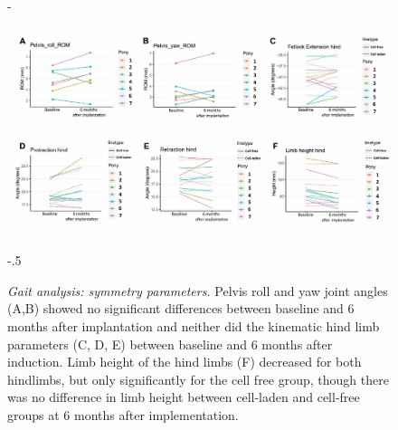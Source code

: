 \documentclass[twocolumn, empirical, authordate, issue]{jote-new-article}
\begin{document}
\begin{figure}
\captionsetup{width=\dimexpr \linewidth + \fullwidthlen\relax}

\begin{adjustwidth}{-\fullwidthlen}{}

 \includegraphics[width=\columnwidth+.8\fullwidthlen]{media/image12.jpg}
  \end{adjustwidth}
\begin{adjustwidth}{-.5\fullwidthlen}{}
\caption{\emph{Gait analysis: symmetry parameters.}
 Pelvis roll and yaw joint angles (A,B) showed no significant differences between baseline and 6 months after implantation and neither did the kinematic hind limb parameters (C, D, E) between baseline and 6 months after induction. Limb height of the hind limbs (F) decreased for both hindlimbs, but only significantly for the cell free group, though there was no difference in limb height between cell-laden and cell-free groups at 6 months after implementation.}
 \label{fig:sup1}
 \end{adjustwidth}
\end{figure}
\end{document}
